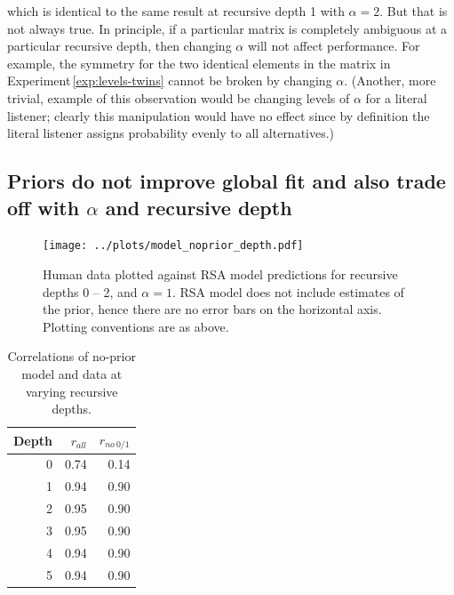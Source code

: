 \documentclass[man,noapacite]{apa2}
\newcounter{Experiment}
\newcommand{\exptref}[1]{Experiment\,\ref{#1}}
\begin{document}
\noindent which is identical to the same result at recursive depth 1 with $\alpha = 2$. But that is not always true. In principle, if a particular matrix is completely ambiguous at a particular recursive depth, then changing $\alpha$ will not affect performance. For example, the symmetry for the two identical elements in the matrix in \exptref{exp:levels-twins} cannot be broken by changing $\alpha$. (Another, more trivial, example of this observation would be changing levels of $\alpha$ for a literal listener; clearly this manipulation would have no effect since by definition the literal listener assigns probability evenly to all alternatives.)

\subsection{Priors do not improve global fit and also trade off with $\alpha$ and recursive depth}

\begin{figure}[t]
 \centering
 \texttt{[image: ../plots/model\_noprior\_depth.pdf]}
 \caption{\label{fig:noprior} Human data plotted against RSA model predictions for recursive depths 0 -- 2, and $\alpha=1$. RSA model does not include estimates of the prior, hence there are no error bars on the horizontal axis. Plotting conventions are as above.}
\end{figure}

\begin{table}[ht]
\centering
\begin{tabular}{rrr}
  \hline
  Depth & $r_{all}$ & $r_{no~0/1}$ \\
  \hline
  0 & 0.74 & 0.14 \\
    1 & 0.94 & 0.90 \\
    2 & 0.95 & 0.90 \\
    3 & 0.95 & 0.90 \\
    4 & 0.94 & 0.90 \\
    5 & 0.94 & 0.90 \\
   \hline
\end{tabular}
\caption{\label{tab:corrs-noprior} Correlations of no-prior model and data at varying recursive depths.}
\end{table}
\end{document}
